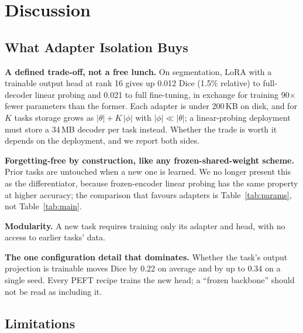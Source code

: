 \documentclass[journal,twoside,web]{ieeecolor}
\begin{document}
\section{Discussion}
\label{sec:discussion}

\subsection{What Adapter Isolation Buys}
\label{sec:strengths}

\textbf{A defined trade-off, not a free lunch.} On segmentation, LoRA with a trainable output head at rank 16 gives up 0.012 Dice (1.5\% relative) to full-decoder linear probing and 0.021 to full fine-tuning, in exchange for training 90$\times$ fewer parameters than the former. Each adapter is under 200\,KB on disk, and for $K$ tasks storage grows as $|\theta| + K\,|\phi|$ with $|\phi| \ll |\theta|$; a linear-probing deployment must store a 34\,MB decoder per task instead. Whether the trade is worth it depends on the deployment, and we report both sides.

\textbf{Forgetting-free by construction, like any frozen-shared-weight scheme.} Prior tasks are untouched when a new one is learned. We no longer present this as the differentiator, because frozen-encoder linear probing has the same property at higher accuracy; the comparison that favours adapters is Table~\ref{tab:params}, not Table~\ref{tab:main}.

\textbf{Modularity.} A new task requires training only its adapter and head, with no access to earlier tasks' data.

\textbf{The one configuration detail that dominates.} Whether the task's output projection is trainable moves Dice by 0.22 on average and by up to 0.34 on a single seed. Every PEFT recipe trains the new head; a ``frozen backbone'' should not be read as including it.

\subsection{Limitations}
\label{sec:limitations}
\end{document}
